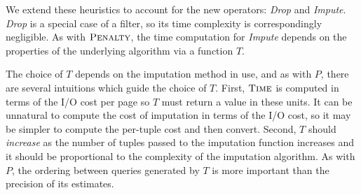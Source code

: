 We extend these heuristics to account for the new operators: \textit{Drop} and \textit{Impute}.
\textit{Drop} is a special case of a filter, so its time complexity is correspondingly negligible. 
As with $\textsc{Penalty}$, the time computation for \textit{Impute} depends on the properties of the underlying algorithm via a function $T$.

The choice of $T$ depends on the imputation method in use, and as with $P$, there are several intuitions which guide the choice of $T$.
First, $\textsc{Time}$ is computed in terms of the I/O cost per page so $T$ must return a value in these units.
It can be unnatural to compute the cost of imputation in terms of the I/O cost, so it may be simpler to compute the per-tuple cost and then convert.
Second, $T$ should \emph{increase} as the number of tuples passed to the imputation function increases and it should be proportional to the complexity of the imputation algorithm.
As with $P$, the ordering between queries generated by $T$ is more important than the precision of its estimates.



